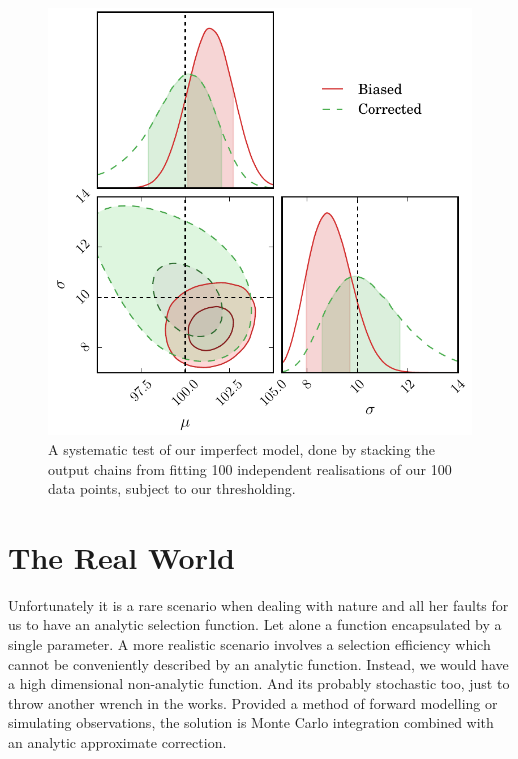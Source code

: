 \documentclass[a4paper,fleqn,usenatbib]{mnras}
\begin{document}
\begin{figure}
	\begin{center}
		\includegraphics[width=\columnwidth]{example/imperfect.pdf}
	\end{center}
	\caption{A systematic test of our imperfect model, done by stacking the output chains from fitting 100 independent realisations of our 100 data points, subject to our thresholding.}
	\label{fig:imperfect}
\end{figure}

\section{The Real World}

Unfortunately it is a rare scenario when dealing with nature and all her faults for us to have an analytic selection function. Let alone a function encapsulated by a single parameter. A more realistic scenario involves a selection efficiency which cannot be conveniently described by an analytic function. Instead, we would have a high dimensional non-analytic function. And its probably stochastic too, just to throw another wrench in the works. Provided a method of forward modelling or simulating observations, the solution is Monte Carlo integration combined with an analytic approximate correction.
\end{document}
